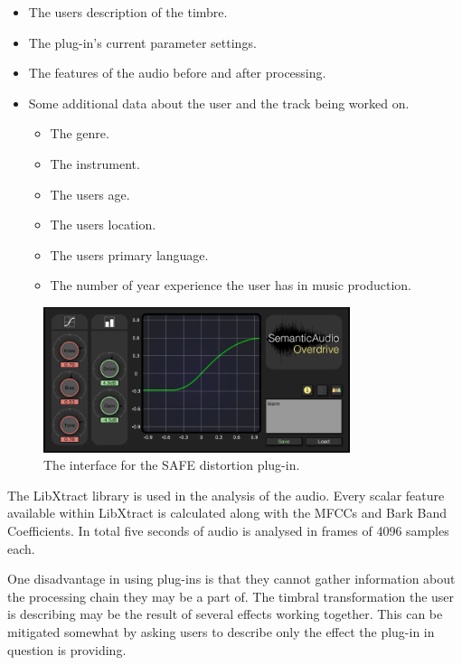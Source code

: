 		\begin{itemize}
			\item The users description of the timbre.
			\item The plug-in's current parameter settings.
			\item The features of the audio before and after processing.
			\item Some additional data about the user and the track being worked on.
			\begin{itemize}
				\item The genre.
				\item The instrument.
				\item The users age.
				\item The users location.
				\item The users primary language.
				\item The number of year experience the user has in music production.
			\end{itemize}
		\end{itemize}

		\begin{figure}[h!]
			\centering
			\includegraphics[width=0.8\textwidth]{chapter4/Images/SAFEDistortion.png}
			\caption{The interface for the SAFE distortion plug-in.}
			\label{fig:SAFE-Distortion}
		\end{figure}

		The LibXtract library \citep{bullock2007libxtract} is used in the analysis of the audio. Every scalar
		feature available within LibXtract is calculated along with the MFCCs and Bark Band Coefficients. In total
		five seconds of audio is analysed in frames of 4096 samples each.



		One disadvantage in using plug-ins is that they cannot gather information about the processing chain they
		may be a part of. The timbral transformation the user is describing may be the result of several effects
		working together. This can be mitigated somewhat by asking users to describe only the effect the plug-in in
		question is providing.


